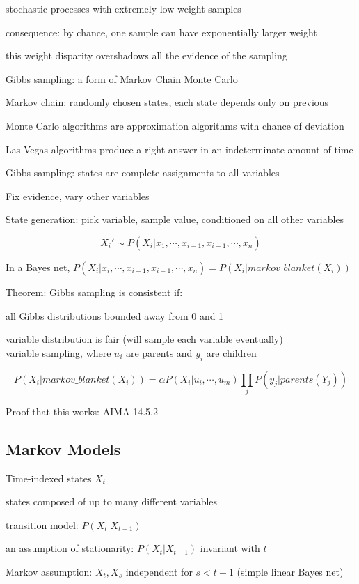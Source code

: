 \documentclass[12pt]{article}
\begin{document}
stochastic processes with extremely low-weight samples

consequence: by chance, one sample can have exponentially larger weight

this weight disparity overshadows all the evidence of the sampling

\noindent
Gibbs sampling: a form of Markov Chain Monte Carlo

Markov chain: randomly chosen states, each state depends only on previous

Monte Carlo algorithms are approximation algorithms with chance of deviation

Las Vegas algorithms produce a right answer in an indeterminate amount of time

Gibbs sampling: states are complete assignments to all variables

Fix evidence, vary other variables

State generation: pick variable, sample value, conditioned on all other variables

$$X_i' \sim P(X_i | x_1, \cdots, x_{i - 1}, x_{i + 1}, \cdots, x_n)$$

In a Bayes net, $P(X_i | x_i, \cdots, x_{i-1}, x_{i + 1}, \cdots, x_n) = P(X_i | markov\_blanket(X_i))$

Theorem: Gibbs sampling is consistent if:

all Gibbs distributions bounded away from 0 and 1

variable distribution is fair (will sample each variable eventually)\\

variable sampling, where $u_i$ are parents and $y_i$ are children

$$P(X_i| markov\_blanket(X_i)) = \alpha P(X_i|u_i, \cdots, u_m) \prod_j P(y_j | parents(Y_j))$$

Proof that this works: AIMA 14.5.2

\subsection{Markov Models}

\noindent
Time-indexed states $X_t$

states composed of up to many different variables

transition model: $P(X_t|X_{t-1})$

an assumption of stationarity: $P(X_t|X_{t-1})$ invariant with $t$

Markov assumption: $X_t, X_s$ independent for $s < t - 1$ (simple linear Bayes net)
\end{document}
